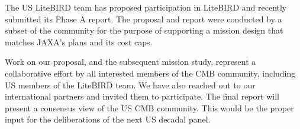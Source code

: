 The US LiteBIRD team has proposed participation in LiteBIRD and recently submitted its Phase A 
report. The proposal and report were conducted by a subset of the community for the purpose of 
supporting a mission design that matches JAXA's plans and its cost caps. 

Work on our proposal, and 
the subsequent mission study, represent a collaborative effort by all interested members of the 
CMB community, including US members of the LiteBIRD team. We have also reached out to our international partners 
and invited them to participate. The final report will present a consensus view of the US CMB community. 
This would be the proper input for the deliberations of the next US decadal panel. 



























